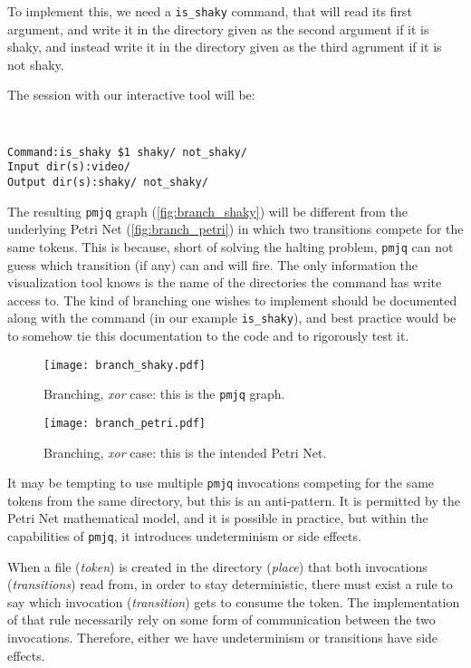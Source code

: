 \documentclass[letterpaper,twocolumn,10pt]{article}
\begin{document}
To implement this, we need a {\tt is\_shaky} command, that will read its first argument, and write it in the directory given as the second argument if it is shaky, and instead write it in the directory given as the third agrument if it is not shaky.

The session with our interactive tool will be:
{\tt \small
\begin{verbatim}
Command:is_shaky $1 shaky/ not_shaky/
Input dir(s):video/
Output dir(s):shaky/ not_shaky/
\end{verbatim}
}

The resulting {\tt pmjq} graph (\autoref{fig:branch_shaky}) will be different from the underlying Petri Net (\autoref{fig:branch_petri}) in which two transitions compete for the same tokens. This is because, short of solving the halting problem, {\tt pmjq} can not guess which transition (if any) can and will fire. The only information the visualization tool knows is the name of the directories the command has write access to. The kind of branching one wishes to implement should be documented along with the command (in our example {\tt is\_shaky}), and best practice would be to somehow tie this documentation to the code and to rigorously test it.  

\begin{figure}[t]
\begin{center}
\texttt{[image: branch\_shaky.pdf]}
\end{center}
\caption{Branching, \emph{xor} case: this is the {\tt pmjq} graph.}
\label{fig:branch_shaky}
\end{figure}

\begin{figure}[t]
\begin{center}
\texttt{[image: branch\_petri.pdf]}
\end{center}
\caption{Branching, \emph{xor} case: this is the intended Petri Net.}
\label{fig:branch_petri}
\end{figure}

It may be tempting to use multiple {\tt pmjq} invocations competing for the same tokens from the same directory, but this is an anti-pattern. It is permitted by the Petri Net mathematical model, and it is possible in practice, but within the capabilities of {\tt pmjq}, it introduces undeterminism or side effects.

When a file (\emph{token}) is created in the directory (\emph{place}) that both invocations (\emph{transitions}) read from, in order to stay deterministic, there must exist a rule to say which invocation (\emph{transition}) gets to consume the token. The implementation of that rule necessarily rely on some form of communication between the two invocations. Therefore, either we have undeterminism or transitions have side effects.
\end{document}
